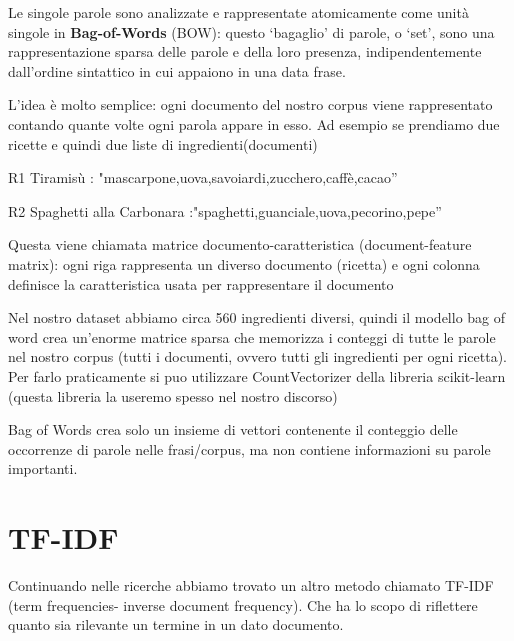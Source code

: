 \documentclass[12pt]{report}
\begin{document}
Le singole parole sono analizzate e rappresentate atomicamente come unità singole in 
\textbf{Bag-of-Words} (BOW): questo ‘bagaglio’ di parole, o ‘set’, sono una rappresentazione sparsa delle parole e della loro presenza, indipendentemente dall'ordine sintattico in cui appaiono in una data frase.

L'idea è molto semplice: ogni documento del nostro corpus viene rappresentato contando quante volte ogni parola appare in esso.
Ad esempio se prendiamo due ricette e quindi due liste di ingredienti(documenti) 

R1 Tiramisù : "mascarpone,uova,savoiardi,zucchero,caffè,cacao”

R2 Spaghetti alla Carbonara :"spaghetti,guanciale,uova,pecorino,pepe” 

\begin{center}
\end{center}

Questa viene chiamata matrice documento-caratteristica (document-feature matrix): ogni riga rappresenta un diverso documento (ricetta) e ogni colonna definisce la caratteristica usata per rappresentare il documento

Nel nostro dataset abbiamo circa 560 ingredienti diversi, quindi il modello bag of word crea un'enorme matrice sparsa che memorizza i conteggi di tutte le parole nel nostro corpus (tutti i documenti, ovvero tutti gli ingredienti per ogni ricetta). Per farlo praticamente si puo utilizzare CountVectorizer della libreria scikit-learn (questa libreria la useremo spesso nel nostro discorso)

Bag of Words crea solo un insieme di vettori contenente il conteggio delle occorrenze di parole nelle frasi/corpus, ma non contiene informazioni su parole importanti.

\section{TF-IDF}

Continuando nelle ricerche abbiamo trovato un altro metodo chiamato TF-IDF (term frequencies- inverse document frequency). Che ha lo scopo di riflettere quanto sia rilevante un termine in un dato documento.
\end{document}
